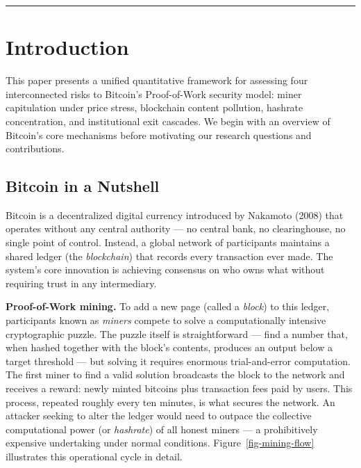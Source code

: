 \documentclass[
  11pt,
]{article}
\let\oldsection\section
\renewcommand{\section}[1]{\FloatBarrier\oldsection{#1}}
\let\oldsubsection\subsection
\renewcommand{\subsection}[1]{\FloatBarrier\oldsubsection{#1}}
\begin{document}
\begin{center}\rule{0.5\linewidth}{0.5pt}\end{center}

\hypertarget{introduction}{%
\section{Introduction}\label{introduction}}

This paper presents a unified quantitative framework for assessing four
interconnected risks to Bitcoin's Proof-of-Work security model: miner
capitulation under price stress, blockchain content pollution, hashrate
concentration, and institutional exit cascades. We begin with an
overview of Bitcoin's core mechanisms before motivating our research
questions and contributions.

\hypertarget{bitcoin-in-a-nutshell}{%
\subsection{Bitcoin in a Nutshell}\label{bitcoin-in-a-nutshell}}

Bitcoin is a decentralized digital currency introduced by Nakamoto
(2008) that operates without any central authority --- no central bank,
no clearinghouse, no single point of control. Instead, a global network
of participants maintains a shared ledger (the \emph{blockchain}) that
records every transaction ever made. The system's core innovation is
achieving consensus on who owns what without requiring trust in any
intermediary.

\textbf{Proof-of-Work mining.} To add a new page (called a \emph{block})
to this ledger, participants known as \emph{miners} compete to solve a
computationally intensive cryptographic puzzle. The puzzle itself is
straightforward --- find a number that, when hashed together with the
block's contents, produces an output below a target threshold --- but
solving it requires enormous trial-and-error computation. The first
miner to find a valid solution broadcasts the block to the network and
receives a reward: newly minted bitcoins plus transaction fees paid by
users. This process, repeated roughly every ten minutes, is what secures
the network. An attacker seeking to alter the ledger would need to
outpace the collective computational power (or \emph{hashrate}) of all
honest miners --- a prohibitively expensive undertaking under normal
conditions. Figure~\ref{fig-mining-flow} illustrates this operational
cycle in detail.
\end{document}
